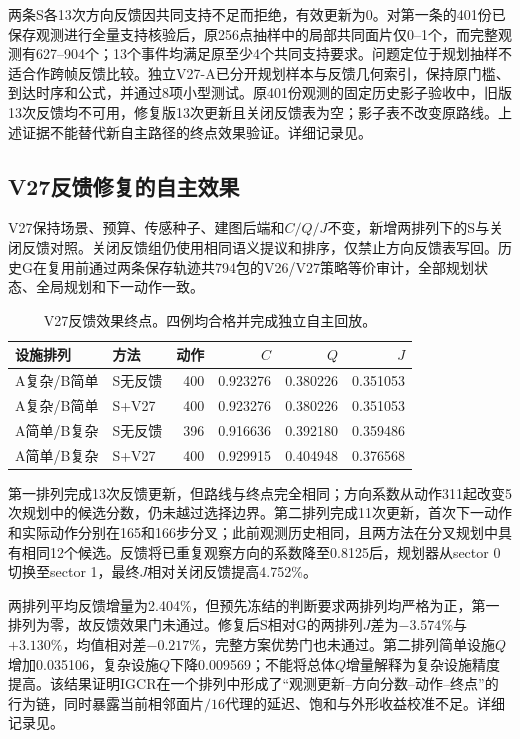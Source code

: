 \documentclass[11pt,a4paper]{article}
\begin{document}
两条S各13次方向反馈因共同支持不足而拒绝，有效更新为0。对第一条的401份已保存观测进行全量支持核验后，原256点抽样中的局部共同面片仅0--1个，而完整观测有627--904个；13个事件均满足原至少4个共同支持要求。问题定位于规划抽样不适合作跨帧反馈比较。独立V27-A已分开规划样本与反馈几何索引，保持原门槛、到达时序和公式，并通过8项小型测试。原401份观测的固定历史影子验收中，旧版13次反馈均不可用，修复版13次更新且关闭反馈表为空；影子表不改变原路线。上述证据不能替代新自主路径的终点效果验证。详细记录见。

\subsection{V27反馈修复的自主效果}

V27保持场景、预算、传感种子、建图后端和$C/Q/J$不变，新增两排列下的S与关闭反馈对照。关闭反馈组仍使用相同语义提议和排序，仅禁止方向反馈表写回。历史G在复用前通过两条保存轨迹共794包的V26/V27策略等价审计，全部规划状态、全局规划和下一动作一致。

\begin{table}[htbp]
\centering
\caption{V27反馈效果终点。四例均合格并完成独立自主回放。}
\label{tab:v27-feedback}
\begin{tabular}{llrrrr}
\toprule
设施排列 & 方法 & 动作 & $C$ & $Q$ & $J$\\
\midrule
A复杂/B简单 & S无反馈 & 400 & 0.923276 & 0.380226 & 0.351053\\
A复杂/B简单 & S+V27 & 400 & 0.923276 & 0.380226 & 0.351053\\
A简单/B复杂 & S无反馈 & 396 & 0.916636 & 0.392180 & 0.359486\\
A简单/B复杂 & S+V27 & 400 & 0.929915 & 0.404948 & 0.376568\\
\bottomrule
\end{tabular}
\end{table}

第一排列完成13次反馈更新，但路线与终点完全相同；方向系数从动作311起改变5次规划中的候选分数，仍未越过选择边界。第二排列完成11次更新，首次下一动作和实际动作分别在165和166步分叉；此前观测历史相同，且两方法在分叉规划中具有相同12个候选。反馈将已重复观察方向的系数降至0.8125后，规划器从sector 0切换至sector 1，最终$J$相对关闭反馈提高4.752\%。

两排列平均反馈增量为2.404\%，但预先冻结的判断要求两排列均严格为正，第一排列为零，故反馈效果门未通过。修复后S相对G的两排列$J$差为$-3.574\%$与$+3.130\%$，均值相对差$-0.217\%$，完整方案优势门也未通过。第二排列简单设施$Q$增加0.035106，复杂设施$Q$下降0.009569；不能将总体$Q$增量解释为复杂设施精度提高。该结果证明IGCR在一个排列中形成了“观测更新--方向分数--动作--终点”的行为链，同时暴露当前相邻面片$/16$代理的延迟、饱和与外形收益校准不足。详细记录见。
\end{document}

